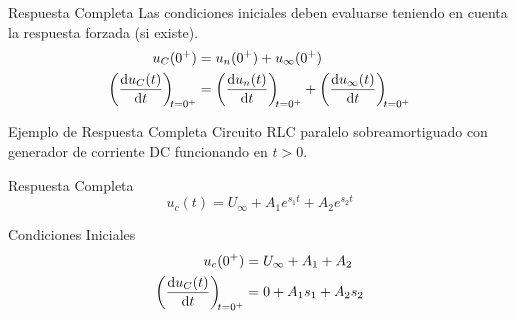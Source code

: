 \documentclass[aspectratio=169, usenames,svgnames,dvipsnames]{beamer}
\begin{document}
\begin{frame}[label={sec:org75a1a1e}]{Respuesta Completa}
Las condiciones iniciales deben evaluarse teniendo en cuenta la respuesta forzada (si existe).
\begin{align*}
  u_C(0^+) &= u_n(0^+) + u_{\infty}(0^+)\\
  \diff{u_C(t)}{t}[t = 0^+] &= \diff{u_n(t)}{t}[t = 0^+] + \diff{u_{\infty}(t)}{t}[t = 0^+]  
\end{align*}
\end{frame}
\begin{frame}[label={sec:org50704c7}]{Ejemplo de Respuesta Completa}
Circuito RLC paralelo sobreamortiguado con generador de corriente DC funcionando en \(t > 0\). 
\begin{block}{Respuesta Completa}
\[
  u_c(t) = U_{\infty} + A_1 e^{s_1 t} + A_2 e^{s_2 t}
\]
\end{block}
\begin{block}{Condiciones Iniciales}
\begin{align*}
u_c(0^+) &= U_\infty + A_1 + A_2\\
\diff{u_C(t)}{t}[t = 0^+] &= 0 + A_1 s_1 + A_2 s_2
\end{align*}
\end{block}
\end{frame}
\end{document}
